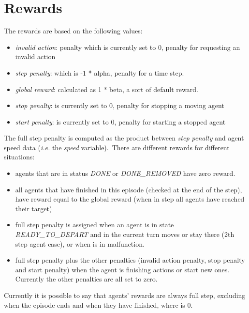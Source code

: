 \section{Rewards}
\label{sec:envRewards}
The rewards are based on the following values:
\begin{itemize}
\item \textit{invalid action}: penalty which is currently set to 0, penalty for requesting an invalid action
\item \textit{step penalty}: which is -1 * alpha, penalty for a time step.
\item \textit{global reward}: calculated as 1 * beta, a sort of default reward.
\item \textit{stop penalty}: is currently set to 0, penalty for stopping a moving agent
\item \textit{start penalty}: is currently set to 0, penalty for starting a stopped agent
\end{itemize}
The full step penalty is computed as the product between \textit{step penalty} and agent speed data (\textit{i.e.} the \textit{speed} variable).\
There are different rewards for different situations:
\begin{itemize}
\item agents that are in status \textit{DONE} or \textit{DONE\_REMOVED} have zero reward.
\item all agents that have finished in this episode (checked at the end of the step), have reward equal to the global reward (when in step all agents have reached their target)

\item full step penalty is assigned when an agent is in state \textit{READY\_TO\_DEPART} and in the current turn moves or stay there (2th step agent case), or when is in malfunction.
\item full step penalty plus the other penalties (invalid action penalty, stop penalty and start penalty) when the agent is finishing actions or start new ones. Currently the other penalties are all set to zero.
\end{itemize}
Currently it is possible to say that agents’ rewards are always full step, excluding when the episode ends and when they have finished, where is 0.

